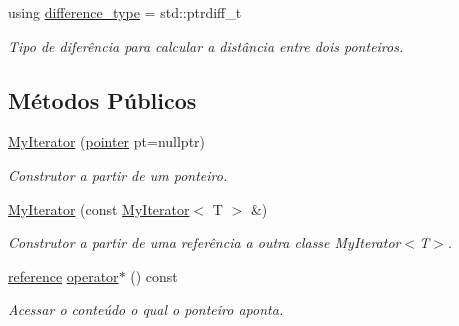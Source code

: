 \begin{DoxyCompactItemize}
\mbox{\label{classsc_1_1MyIterator_ab37e30d9d7abaca8b7ed9c4ba7371798}} 
using \hyperlink{classsc_1_1MyIterator_ab37e30d9d7abaca8b7ed9c4ba7371798}{difference\+\_\+type} = std\+::ptrdiff\+\_\+t
\begin{DoxyCompactList}\small\item\em Tipo de diferência para calcular a distância entre dois ponteiros. \end{DoxyCompactList}\end{DoxyCompactItemize}
\subsection*{Métodos Públicos}
\begin{DoxyCompactItemize}
\item 
\mbox{\label{classsc_1_1MyIterator_a4ebed96cc5759db0edaeafc39910af27}} 
\hyperlink{classsc_1_1MyIterator_a4ebed96cc5759db0edaeafc39910af27}{My\+Iterator} (\hyperlink{classsc_1_1MyIterator_aac55734d4d00af05ed90556dd8f8df0b}{pointer} pt=nullptr)
\begin{DoxyCompactList}\small\item\em Construtor a partir de um ponteiro. \end{DoxyCompactList}\item 
\mbox{\label{classsc_1_1MyIterator_aaa0e08bed1cb4a30d52790ef48ef75cf}} 
\hyperlink{classsc_1_1MyIterator_aaa0e08bed1cb4a30d52790ef48ef75cf}{My\+Iterator} (const \hyperlink{classsc_1_1MyIterator}{My\+Iterator}$<$ T $>$ \&)
\begin{DoxyCompactList}\small\item\em Construtor a partir de uma referência a outra classe My\+Iterator$<$\+T$>$. \end{DoxyCompactList}\item 
\mbox{\label{classsc_1_1MyIterator_ae655a959eee3b7ed2bc9a897c537810a}} 
\hyperlink{classsc_1_1MyIterator_a713949524e31c23eade8ea3521c938ef}{reference} \hyperlink{classsc_1_1MyIterator_ae655a959eee3b7ed2bc9a897c537810a}{operator$\ast$} () const
\begin{DoxyCompactList}\small\item\em Acessar o conteúdo o qual o ponteiro aponta. \end{DoxyCompactList}\item 

\end{DoxyCompactItemize}
